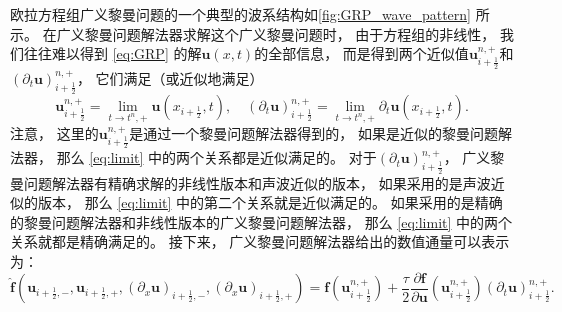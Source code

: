 欧拉方程组广义黎曼问题的一个典型的波系结构如\cref{fig:GRP_wave_pattern} 所示。
在广义黎曼问题解法器求解这个广义黎曼问题时，
由于方程组的非线性，
我们往往难以得到 \cref{eq:GRP} 的解${\bm{u}}(x,t)$的全部信息，
而是得到两个近似值${\bm{u}}_{i+\frac{1}{2}}^{n,+}$和$\left({\partial_{t}}{\bm{u}}\right)_{i+\frac{1}{2}}^{n,+}$，
它们满足（或近似地满足）
\begin{equation}
  \label{eq:limit}
  {\bm{u}}_{i+\frac{1}{2}}^{n,+} = \lim_{t\to t^n,+} {\bm{u}}(x_{i+\frac{1}{2}},t), \quad
  \left({\partial_{t}}{\bm{u}}\right)_{i+\frac{1}{2}}^{n,+} = \lim_{t\to t^n,+} {\partial_{t}}{\bm{u}}(x_{i+\frac{1}{2}},t).
\end{equation}
注意，
这里的${\bm{u}}_{i+\frac{1}{2}}^{n,+}$是通过一个黎曼问题解法器得到的，
如果是近似的黎曼问题解法器，
那么 \cref{eq:limit} 中的两个关系都是近似满足的。
对于$\left({\partial_{t}}{\bm{u}}\right)_{i+\frac{1}{2}}^{n,+}$，
广义黎曼问题解法器有精确求解的非线性版本和声波近似的版本，
如果采用的是声波近似的版本，
那么 \cref{eq:limit} 中的第二个关系就是近似满足的。
如果采用的是精确的黎曼问题解法器和非线性版本的广义黎曼问题解法器，
那么 \cref{eq:limit} 中的两个关系就都是精确满足的。
接下来，
广义黎曼问题解法器给出的数值通量可以表示为：
\begin{equation}
  \hat{\bm{f}}({\bm{u}}_{i+\frac 12,-},{\bm{u}}_{i+\frac 12,+},\left({\partial_x}{\bm u}\right)_{i+\frac{1}{2},-},\left({\partial_x}{\bm u}\right)_{i+\frac{1}{2},+}) = {\bm{f}}\left({\bm{u}}_{i+\frac{1}{2}}^{n,+}\right) + \frac{\tau}{2} \frac{\partial{\bm{f}}}{\partial{\bm{u}}}\left({\bm{u}}_{i+\frac{1}{2}}^{n,+}\right) \left({\partial_{t}}{\bm{u}}\right)_{i+\frac{1}{2}}^{n,+}.
\end{equation}

